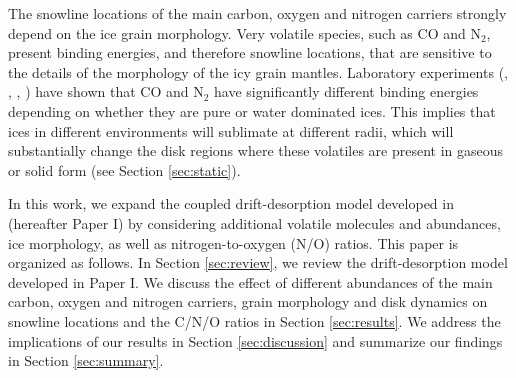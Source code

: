 \documentclass[apj]{emulateapj}
\begin{document}
The snowline locations of the main carbon, oxygen and nitrogen carriers strongly depend on the ice grain morphology. Very volatile species, such as CO and N$_2$, present binding energies, and therefore snowline locations, that are sensitive to the details of the morphology of the icy grain mantles. Laboratory experiments (\citealt{collings03}, \citealt{oberg05}, \citealt{bisschop06}, \citealt{fayolle16}) have shown that CO and N$_2$ have significantly different binding energies depending on whether they are pure or water dominated ices. This implies that ices in different environments will sublimate at different radii, which will substantially change the disk regions where these volatiles are present in gaseous or solid form (see Section \ref{sec:static}).  

 


In this work, we expand the coupled drift-desorption model developed in \citet{piso15b} (hereafter Paper I) by considering additional volatile molecules and abundances, ice morphology, as well as nitrogen-to-oxygen (N/O) ratios. This paper is organized as follows. In Section \ref{sec:review}, we review the drift-desorption model developed in Paper I. We discuss the effect of different abundances of the main carbon, oxygen and nitrogen carriers, grain morphology and disk dynamics on snowline locations and the C/N/O ratios in Section \ref{sec:results}. We address the implications of our results in Section \ref{sec:discussion} and summarize our findings in Section \ref{sec:summary}.  
\end{document}
